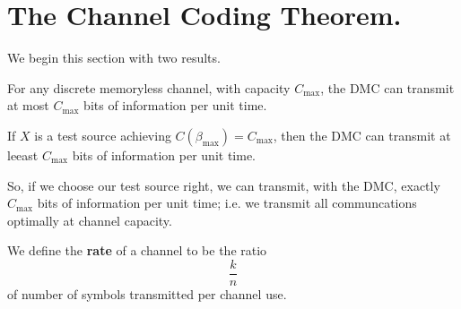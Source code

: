 
\section{The Channel Coding Theorem.}
\label{section1}

We begin this section with two results.

\begin{lemma}\label{3.2.1}
    For any discrete memoryless channel, with capacity $C_{\max}$, the DMC can
    transmit at most $C_{\max}$ bits of information per unit time.
\end{lemma}
\begin{corollary}
    If $X$ is a test source achieving  $C(\beta_{\max})=C_{\max}$, then the DMC
    can transmit at leeast $C_{\max}$ bits of information per unit time.
\end{corollary}
\begin{remark}
    So, if we choose our test source right, we can transmit, with the DMC,
    exactly $C_{\max}$ bits of information per unit time; i.e. we transmit all
    communcations optimally at channel capacity.
\end{remark}

\begin{definition}
    We define the \textbf{rate} of a channel to be the ratio
    \begin{equation}
        \frac{k}{n}
    \end{equation}
    of number of symbols transmitted per channel use.
\end{definition}


